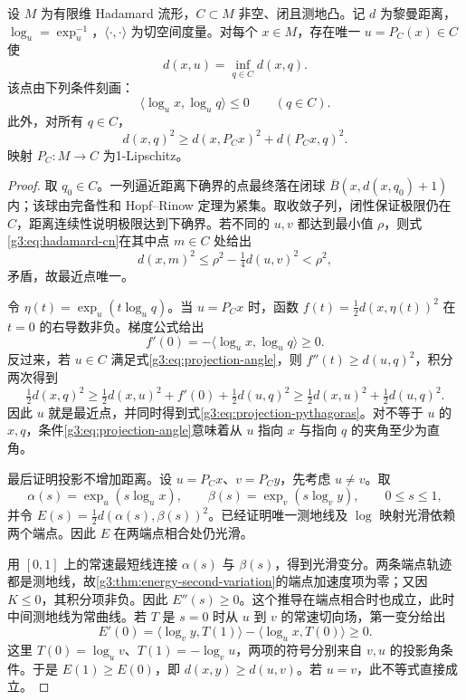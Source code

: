 \begin{theorem}\label{g3:thm:hadamard-projection}
	设 \(M\) 为有限维 Hadamard 流形，\(C\subset M\) 非空、闭且测地凸。记 \(d\) 为黎曼距离，\(\log_u=\exp_u^{-1}\)，\(\langle\cdot,\cdot\rangle\) 为切空间度量。对每个 \(x\in M\)，存在唯一 \(u=P_C(x)\in C\) 使
	\[
		d(x,u)=\inf_{q\in C}d(x,q).
	\]
	该点由下列条件刻画：
	\begin{equation}\label{g3:eq:projection-angle}
		\langle\log_u x,\log_u q\rangle\le0
		\qquad(q\in C).
	\end{equation}
	此外，对所有 \(q\in C\)，
	\begin{equation}\label{g3:eq:projection-pythagoras}
		d(x,q)^2\ge d(x,P_Cx)^2+d(P_Cx,q)^2.
	\end{equation}
	映射 \(P_C:M\to C\) 为1-Lipschitz。
\end{theorem}
\begin{proof}
	取 \(q_0\in C\)。一列逼近距离下确界的点最终落在闭球 \(\overline B(x,d(x,q_0)+1)\) 内；该球由完备性和 Hopf--Rinow 定理为紧集。取收敛子列，闭性保证极限仍在 \(C\)，距离连续性说明极限达到下确界。若不同的 \(u,v\) 都达到最小值 \(\rho\)，则式\eqref{g3:eq:hadamard-cn}在其中点 \(m\in C\) 处给出
	\[
		d(x,m)^2\le\rho^2-\tfrac14d(u,v)^2<\rho^2,
	\]
	矛盾，故最近点唯一。

	令 \(\eta(t)=\exp_u(t\log_u q)\)。当 \(u=P_Cx\) 时，函数 \(f(t)=\tfrac12d(x,\eta(t))^2\) 在 \(t=0\) 的右导数非负。梯度公式给出
	\[
		f'(0)=-\langle\log_u x,\log_u q\rangle\ge0.
	\]
	反过来，若 \(u\in C\) 满足式\eqref{g3:eq:projection-angle}，则 \(f''(t)\ge d(u,q)^2\)，积分两次得到
	\[
		\tfrac12d(x,q)^2
		\ge\tfrac12d(x,u)^2+f'(0)+\tfrac12d(u,q)^2
		\ge\tfrac12d(x,u)^2+\tfrac12d(u,q)^2.
	\]
	因此 \(u\) 就是最近点，并同时得到式\eqref{g3:eq:projection-pythagoras}。对不等于 \(u\) 的 \(x,q\)，条件\eqref{g3:eq:projection-angle}意味着从 \(u\) 指向 \(x\) 与指向 \(q\) 的夹角至少为直角。

	最后证明投影不增加距离。设 \(u=P_Cx\)、\(v=P_Cy\)，先考虑 \(u\ne v\)。取
	\[
		\alpha(s)=\exp_u(s\log_u x),\qquad
		\beta(s)=\exp_v(s\log_v y),\qquad 0\le s\le1,
	\]
	并令 \(E(s)=\tfrac12d(\alpha(s),\beta(s))^2\)。已经证明唯一测地线及 \(\log\) 映射光滑依赖两个端点。因此 \(E\) 在两端点相合处仍光滑。

	用 \([0,1]\) 上的常速最短线连接 \(\alpha(s)\) 与 \(\beta(s)\)，得到光滑变分。两条端点轨迹都是测地线，故\cref{g3:thm:energy-second-variation}的端点加速度项为零；又因 \(K\le0\)，其积分项非负。因此 \(E''(s)\ge0\)。这个推导在端点相合时也成立，此时中间测地线为常曲线。若 \(T\) 是 \(s=0\) 时从 \(u\) 到 \(v\) 的常速切向场，第一变分给出
	\[
		E'(0)=\langle\log_v y,T(1)\rangle
		-\langle\log_u x,T(0)\rangle\ge0.
	\]
	这里 \(T(0)=\log_u v\)、\(T(1)=-\log_v u\)，两项的符号分别来自 \(v,u\) 的投影角条件。于是 \(E(1)\ge E(0)\)，即 \(d(x,y)\ge d(u,v)\)。若 \(u=v\)，此不等式直接成立。
\end{proof}

